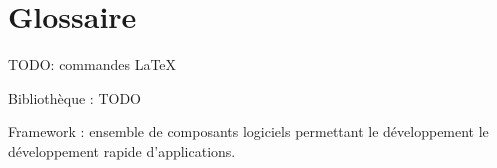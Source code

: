\cleardoublepage

\chapter*{Glossaire}




TODO: commandes LaTeX

Bibliothèque : TODO

Framework : ensemble de composants logiciels permettant le développement le développement rapide d'applications.
